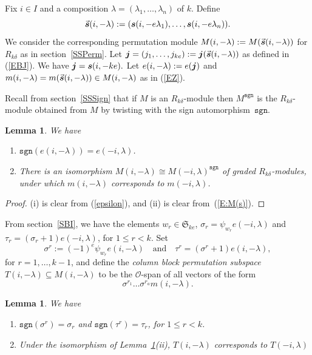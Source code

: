 \documentclass[twoside,11pt,reqno]{amsart}
\numberwithin{equation}{section}
\newtheorem{Lemma}[equation]{Lemma}
\theoremstyle{definition}  %
\newcommand\Comment[2][\relax]{\space\par\medskip\noindent%
   \fbox{\begin{minipage}{\textwidth}\textbf{Comment\ifx\relax#1\else---#1\fi}\newline%
        #2\end{minipage}}\medskip
}
\def\bj{\text{\boldmath$j$}}
\def\bs{\text{\boldmath$s$}}
\def\sgn{\mathtt{sgn}}
\newcommand{\0}{{\bar 0}}
\newcommand{\1}{{\bar 1}}
\newcommand{\la}{\lambda}
\newcommand{\al}{\alpha}
\def\Si{\mathfrak{S}}
\newcommand{\si}{\sigma}
\newcommand{\de}{\delta}
\renewcommand\O{\mathcal O}
\newenvironment{braid}{%
  \begin{tikzpicture}[baseline=6mm,blue,line width=1pt, scale=0.4,
                      draw/.append style={rounded corners},
                      every node/.append style={font=\fontsize{5}{5}\selectfont}]%
  }{\end{tikzpicture}
}
\newcommand\iicrossing[1][i]{%
  \begin{braid}\tikzset{baseline=0mm,scale=0.5}
    \useasboundingbox (-0.6,0) rectangle (1,1.9);
    \draw(0,1)node[left=-1mm]{$#1$}--(1,0);
    \draw(1,1)node[right=-1mm]{$#1$}--(0,0);
  \end{braid}%
}
\begin{document}
Fix $i\in I$ and a composition $\la=(\la_1,\dots,\la_n)$ of $k$. Define
$$\vec{\bs}(i,-\la):=(\bs(i,-e\la_1),\dots,\bs(i,-e\la_n)).$$ We consider the corresponding permutation module
$M(i,-\la):=M(\vec{\bs}(i,-\la))$ for $R_{k\de}$ as in section~\ref{SSPerm}. Let
$\bj=(j_1,\dots,j_{ke}):=\bj(\vec{\bs}(i,-\la))$ as defined in (\ref{EBJ}). We have 
$\bj=\bs(i,-ke). 
$
Let 
$
e(i,-\la):=e(\bj)
$ 
and $m(i,-\la)=m(\vec{\bs}(i,-\la))\in M(i,-\la)$ as in (\ref{EZ}). 

Recall from section~\ref{SSSign} that if $M$ is an $R_{k\delta}$-module then $M^\sgn$
is the $R_{k\delta}$-module obtained from $M$ by twisting with the sign automorphism~$\sgn$.


\begin{Lemma}\label{L:permIso}
We have 
  \begin{enumerate}
     \item $\sgn(e(i,-\la))=e(-i,\la)$.
     \item There is an isomorphism $M(i,-\la) \cong M(-i,\la)^\sgn$ of graded $R_{k\delta}$-modules, under which $m(i,-\la)$ corresponds to $m(-i,\la)$.
  \end{enumerate}
\end{Lemma}

\begin{proof}
(i) is clear from (\ref{epsilon}),  and (ii) is clear from~(\ref{E:M(s)}).
\end{proof}

From section~\ref{SBI}, we have the elements $w_r\in\Si_{ke}$, $\sigma_r=\psi_{w_r}e(-i,\la)$ and
$\tau_r=(\si_r+1)e(-i,\la)$, for $1\le r<k$. Set 
$$\si^r:=(-1)^{e}\psi_{w_r}e(i,-\la)\quad\text{and}\quad\tau^r=(\si^r+1)e(i,-\la),$$ 
for $r=1,\dots,k-1$, and define the {\em column block permutation subspace} $T(i,-\la)\subseteq M(i,-\la)$ to be the $\O$-span of all vectors of the form 
\begin{equation}\label{ESi^r}
\si^{r_1}\dots\si^{r_a}m(i,-\la).
\end{equation}



\begin{Lemma}\label{rho translation}%
We have
\begin{enumerate}
\item $\sgn(\si^r)=\si_r$ and $\sgn(\tau^r)=\tau_r$, for $1\le r<k$.
\item Under the isomorphism of Lemma~\ref{L:permIso}(ii),  $T(i,-\la)$ corresponds  to $T(-i,\la)$
\end{enumerate}
\end{Lemma}
\end{document}
